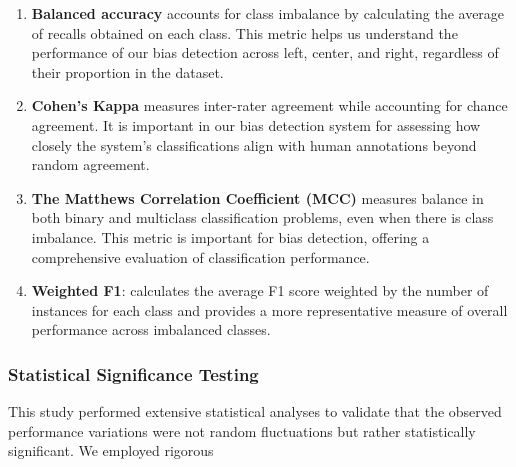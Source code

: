 \documentclass[11pt]{article}
\begin{document}
 
\begin{enumerate}
    \item \textbf {Balanced accuracy} accounts for class imbalance by calculating the average of recalls obtained on each class. This metric helps us understand the performance of our bias detection across left, center, and right, regardless of their proportion in the dataset.


    \item \textbf {Cohen’s Kappa} measures inter-rater agreement while accounting for chance agreement. It is important in our bias detection system  for assessing how closely the system’s classifications align with human annotations beyond random agreement.

 
    \item \textbf {The Matthews Correlation Coefficient (MCC)} measures balance in both binary and multiclass classification problems, even when there is class imbalance. This metric is important  for bias detection, offering a comprehensive evaluation of classification performance.



    \item \textbf {Weighted F1}:  calculates the average F1 score weighted by the number of instances for each class and provides a more representative measure of overall performance across imbalanced classes.

\end{enumerate}
\subsubsection{Statistical Significance Testing}

This study performed extensive statistical analyses to validate that the observed performance variations were not random fluctuations but rather statistically significant. We employed rigorous
\end{document}
